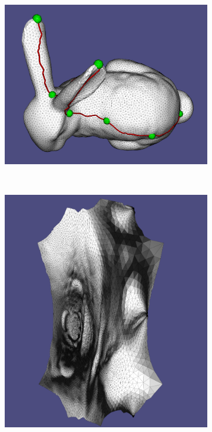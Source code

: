 \begin{figure}
\begin{subfigure}{0.3\textwidth}
\includegraphics[height=\textwidth]{images/bunny_hyper}
\caption{}
\end{subfigure}\ \ \ \ \ \ \ \ \ \ \ \ \ \ \ \ \ \ \ \ \ \ \ \ \ 
\begin{subfigure}{0.3\textwidth}
\includegraphics[height=\textwidth]{images/bunny_hyper_emb}

\end{subfigure}
\end{figure}
